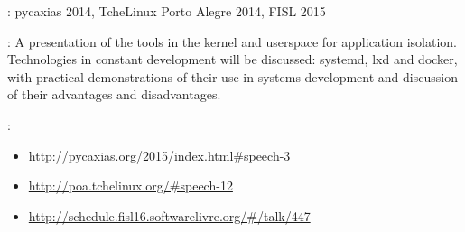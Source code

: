 \begin{description}[noitemsep]
    \item[Events]: pycaxias 2014, TcheLinux Porto Alegre 2014, FISL 2015
    \item[Summary]:
        A presentation of the tools in the kernel and userspace for application
        isolation. Technologies in constant development will be discussed:
        systemd, lxd and docker, with practical demonstrations of their use in
        systems development and discussion of their advantages and
        disadvantages.
    \item[Websites]:
        \begin{itemize}[noitemsep]
            \item \url{http://pycaxias.org/2015/index.html#speech-3}
            \item \url{http://poa.tchelinux.org/#speech-12}
            \item \url{http://schedule.fisl16.softwarelivre.org/#/talk/447}
        \end{itemize}
\end{description}
